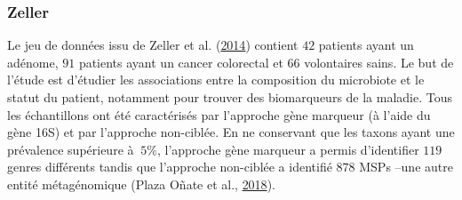 \documentclass[12pt,a4paper]{reedthesis}
\theoremstyle{definition}
\theoremstyle{definition}
\theoremstyle{definition}
\theoremstyle{remark}
\begin{document}
\hypertarget{zeller}{%
\subsubsection*{Zeller}\label{zeller}}

Le jeu de données issu de Zeller et al. (\protect\hyperlink{ref-zeller2014potential}{2014}) contient \(42\) patients ayant un adénome, \(91\) patients ayant un cancer colorectal et \(66\) volontaires sains. Le but de l'étude est d'étudier les associations entre la composition du microbiote et le statut du patient, notamment pour trouver des biomarqueurs de la maladie. Tous les échantillons ont été caractérisés par l'approche gène marqueur (à l'aide du gène 16S) et par l'approche non-ciblée. En ne conservant que les taxons ayant une prévalence supérieure à \(~5\%\), l'approche gène marqueur a permis d'identifier \(119\) genres différents tandis que l'approche non-ciblée a identifié \(878\) MSPs --une autre entité métagénomique (Plaza Oñate et al., \protect\hyperlink{ref-plaza2018mspminer}{2018}).
\end{document}
